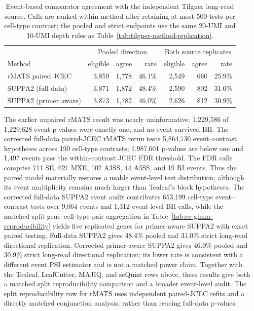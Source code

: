\documentclass[11pt]{article}
\begin{document}
\begin{table}[H]
\centering
\scriptsize
\caption{Event-based comparator agreement with the independent Tilgner long-read source. Calls are ranked within method after retaining at most 500 tests per cell-type contrast; the pooled and strict endpoints use the same 20-UMI and 10-UMI depth rules as Table~\ref{tab:tilgner-method-replication}.}
\label{tab:event-comparator-tilgner}
\begin{tabular}{lrrr|rrr}
\toprule
& \multicolumn{3}{c|}{Pooled direction} & \multicolumn{3}{c}{Both source replicates}\\
Method & eligible & agree & rate & eligible & agree & rate\\
\midrule
rMATS paired JCEC & 3,859 & 1,778 & 46.1\% & 2,549 & 660 & 25.9\%\\
SUPPA2 (full data) & 3,871 & 1,872 & 48.4\% & 2,590 & 802 & 31.0\%\\
SUPPA2 (primer aware) & 3,873 & 1,782 & 46.0\% & 2,626 & 812 & 30.9\%\\
\bottomrule
\end{tabular}
\end{table}

The earlier unpaired rMATS result was nearly uninformative: 1,229,586 of 1,229,628 event p-values were exactly one, and no event survived BH. The corrected full-data paired-JCEC rMATS rerun tests 5,864,730 event--contrast hypotheses across 190 cell-type contrasts; 1,987,601 p-values are below one and 1,497 events pass the within-contrast JCEC FDR threshold. The FDR calls comprise 711 SE, 621 MXE, 102 A3SS, 44 A5SS, and 19 RI events. Thus the paired model materially restores a usable event-level test distribution, although its event multiplicity remains much larger than Tealeaf's block hypotheses. The corrected full-data SUPPA2 event audit contributes 653,199 cell-type event--contrast tests over 9,064 events and 1,312 event-level BH calls, while the matched-split gene--cell-type-pair aggregation in Table~\ref{tab:ec-glmm-reproducibility} yields five replicated genes for primer-aware SUPPA2 with exact paired testing. Full-data SUPPA2 gives 48.4\% pooled and 31.0\% strict long-read directional replication. Corrected primer-aware SUPPA2 gives 46.0\% pooled and 30.9\% strict long-read directional replication; its lower rate is consistent with a different event PSI estimator and is not a matched power claim. Together with the Tealeaf, LeafCutter, MAJIQ, and scQuint rows above, these results give both a matched split reproducibility comparison and a broader event-level audit. The split reproducibility row for rMATS uses independent paired-JCEC refits and a directly matched conjunction analysis, rather than reusing full-data p-values.
\end{document}
